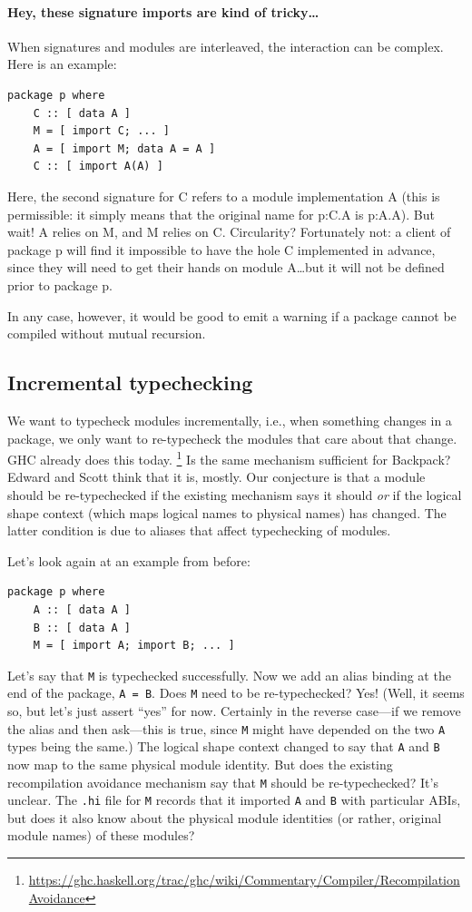 \documentclass{article}
\begin{document}
\paragraph{Hey, these signature imports are kind of tricky\ldots}

When signatures and modules are interleaved, the interaction can be
complex.  Here is an example:

\begin{verbatim}
package p where
    C :: [ data A ]
    M = [ import C; ... ]
    A = [ import M; data A = A ]
    C :: [ import A(A) ]
\end{verbatim}

Here, the second signature for C refers to a module implementation A
(this is permissible: it simply means that the original name for p:C.A
is p:A.A).  But wait! A relies on M, and M relies on C. Circularity?
Fortunately not: a client of package p will find it impossible to have
the hole C implemented in advance, since they will need to get their hands on module
A\ldots but it will not be defined prior to package p.

In any case, however, it would be good to emit a warning if a package
cannot be compiled without mutual recursion.

\subsection{Incremental typechecking}
We want to typecheck modules incrementally, i.e., when something changes in
a package, we only want to re-typecheck the modules that care about that
change. GHC already does this today.%
\footnote{\url{https://ghc.haskell.org/trac/ghc/wiki/Commentary/Compiler/RecompilationAvoidance}}
Is the same mechanism sufficient for Backpack? Edward and Scott think that it
is, mostly. Our conjecture is that a module should be re-typechecked if the
existing mechanism says it should \emph{or} if the logical shape
context (which maps logical names to physical names) has changed. The latter
condition is due to aliases that affect typechecking of modules.

Let's look again at an example from before:
\begin{verbatim}
package p where
    A :: [ data A ]
    B :: [ data A ]
    M = [ import A; import B; ... ]
\end{verbatim}
Let's say that \verb|M| is typechecked successfully. Now we add an alias binding
at the end of the package, \verb|A = B|. Does \verb|M| need to be
re-typechecked? Yes! (Well, it seems so, but let's just assert ``yes'' for now.
Certainly in the reverse case---if we remove the alias and then ask---this
is true, since \verb|M| might have depended on the two \verb|A| types
being the same.)
The logical shape context changed to say that \verb|A| and
\verb|B| now map to the same physical module identity. But does the existing
recompilation avoidance mechanism say that \verb|M| should be re-typechecked?
It's unclear. The \verb|.hi| file for \verb|M| records that it imported \verb|A| and
\verb|B| with particular ABIs, but does it also know about the physical module
identities (or rather, original module names) of these modules?
\end{document}
